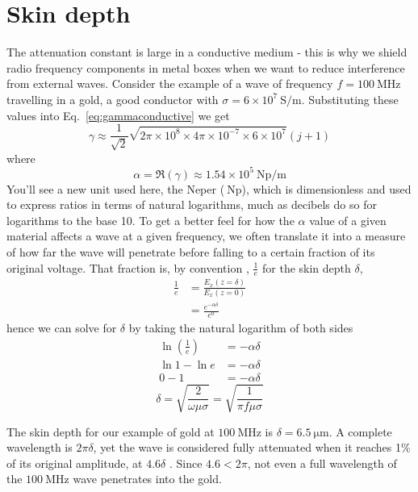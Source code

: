 \documentclass{tufte-handout}
\begin{document}
\section{Skin depth}
The attenuation constant is large in a conductive medium - this is why we shield radio frequency components in metal boxes when we want to reduce interference from external waves. Consider the example of a wave of frequency
 $f = \SI{100}{\mega\hertz}$ travelling in a gold, a good conductor with $\sigma = 6\times10^7\SI{}{\siemens\per\meter}$. Substituting these values into Eq.~\ref{eq:gammaconductive} we get
\begin{equation}
\gamma \approx \frac{1}{\sqrt{2}}\sqrt{2\pi\times 10^8\times4\pi\times 10^{-7}\times6\times 10^{7}}(j+1)
\end{equation}
where
\begin{equation}
\alpha = \Re(\gamma) \approx 1.54\times 10^5\SI{}{\neper\per\metre}
\end{equation}
You'll see a new unit used here, the Neper ($\SI{}{\neper}$), which is dimensionless and used to express ratios in terms of natural logarithms, much as decibels do so for logarithms to the base 10. To get a better feel for how the $\alpha$ value of a given material affects a wave at a given frequency, we often translate it into a measure of how far the wave will penetrate before falling to a certain fraction of its original voltage. That fraction is, by convention , $\frac{1}{e}$ for the skin depth $\delta$,
\begin{align}
\frac{1}{e} &= \frac{E_x(z=\delta)}{E_x(z=0)} \\
&= \frac{e^{-\alpha \delta}}{e^0}  
\end{align}
hence we can solve for $\delta$ by taking the natural logarithm of both sides
\begin{align}
\ln(\frac{1}{e}) &= -\alpha \delta \\
\ln{1}-\ln{e} &= -\alpha\delta \\
0 - 1 &= -\alpha\delta
\end{align}
\begin{equation}
\boxed{\delta = \sqrt{\frac{2}{\omega\mu\sigma}} = \sqrt{\frac{1}{\pi{}f\mu\sigma}}   }
\end{equation}

The skin depth for our example of gold at $\SI{100}{\mega\hertz}$ is $\delta=\SI{6.5}{\micro\meter}$. A complete wavelength is $2\pi\delta$, yet the wave is considered fully attenuated when it reaches 1\% of its original amplitude, at $4.6\delta$ . Since $4.6 < 2\pi$, not even a full wavelength of the $\SI{100}{\mega\hertz}$ wave penetrates into the gold.
\end{document}
